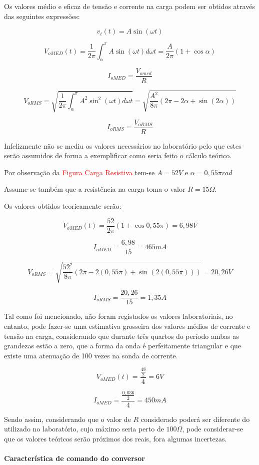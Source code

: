 \documentclass[a4paper,11pt]{article}
\numberwithin{equation}{section}
\begin{document}
Os valores médio e eficaz de tensão e corrente na carga podem ser obtidos através das seguintes expressões:

\[v_i(t)=A \sin(\omega t)\]

\[V_{oMED} (t) = \frac{1}{2\pi} \int_{\alpha}^{\pi} A \sin(\omega t) d \omega t = \frac{A}{2\pi} (1+ \cos\alpha)\]

\[I_{oMED}= \frac{V_{omed}}{R}\]

\[V_{oRMS} = \sqrt{ \frac{1}{2\pi} \int_{\alpha}^{\pi} A^2 \sin^2 (\omega t) d\omega t} = \sqrt{ \frac{A^2}{8 \pi} (2\pi - 2\alpha + \sin(2\alpha))} \]

\[I_{oRMS}= \frac{V_{oRMS}}{R}\]



Infelizmente não se mediu os valores necessários no laboratório pelo que estes serão assumidos de forma a exemplificar como seria feito o cálculo teórico.

Por observação da \textcolor{red}{Figura Carga Resistiva} tem-se $A=52 V$ e $\alpha=0,55\pi rad$

Assume-se também que a resistência na carga toma o valor $R=15 \Omega$.

Os valores obtidos teoricamente serão:

\[V_{oMED} (t) = \frac{52}{2\pi} (1+ \cos0,55\pi) = 6,98 V\]

\[I_{oMED}= \frac{6,98}{15} = 465 mA\]

\[V_{oRMS} = \sqrt{ \frac{52^2}{8 \pi} (2\pi - 2(0,55\pi) + \sin(2(0,55\pi)))} = 20,26 V \]

\[I_{oRMS}= \frac{20,26}{15} = 1,35 A\]

Tal como foi mencionado, não foram registados os valores laboratoriais, no entanto, pode fazer-se uma estimativa grosseira dos valores médios de corrente e tensão na carga, considerando que durante três quartos do período ambas as grandezas estão a zero, que a forma da onda é perfeitamente triangular e que existe uma atenuação de 100 vezes na sonda de corrente.

\[V_{oMED} (t) = \frac{\frac{48}{2}}{4} = 6 V\]

\[I_{oMED}= \frac{\frac{0,036}{2}}{4} = 450 mA\]

Sendo assim, considerando que o valor de $R$ considerado poderá ser diferente do utilizado no laboratório, cujo máximo seria perto de $100 \Omega$, pode considerar-se que os valores teóricos serão próximos dos reais, fora algumas incertezas.

\paragraph{Característica de comando do conversor}
\end{document}

